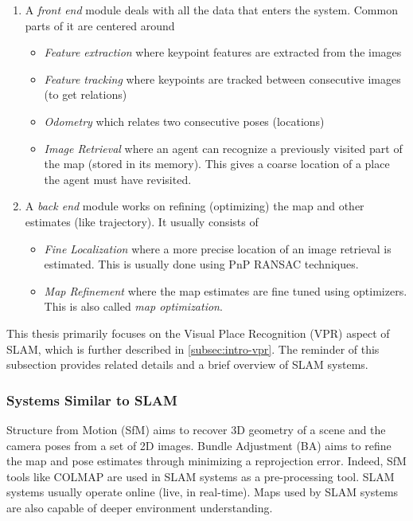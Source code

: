 \begin{enumerate}
    \item A \emph{front end} module deals with all the data that
        enters the system. Common parts of it are centered around
        \begin{itemize}
            \item \emph{Feature extraction} where keypoint features
                are extracted from the images
            \item \emph{Feature tracking} where keypoints are tracked
                between consecutive images (to get relations)
            \item \emph{Odometry} which relates two consecutive poses
                (locations)
            \item \emph{Image Retrieval} where an agent can recognize
                a previously visited part of the map (stored in its
                memory). This gives a coarse location of a place the
                agent must have revisited.
        \end{itemize}
    \item A \emph{back end} module works on refining (optimizing) the
        map and other estimates (like trajectory). It usually consists
        of
        \begin{itemize}
            \item \emph{Fine Localization} where a more precise
                location of an image retrieval is estimated. This is
                usually done using PnP RANSAC techniques.
            \item \emph{Map Refinement} where the map estimates are
                fine tuned using optimizers. This is also called
                \emph{map optimization}.
        \end{itemize}
\end{enumerate}

This thesis primarily focuses on the Visual Place Recognition (VPR)
aspect of SLAM, which is further described in \cref{subsec:intro-vpr}.
The reminder of this subsection provides related details and a brief
overview of SLAM systems.

\subsubsection{Systems Similar to SLAM} 

Structure from Motion (SfM) aims to recover 3D geometry of a scene and
the camera poses from a set of 2D images. Bundle Adjustment (BA) aims
to refine the map and pose estimates through minimizing a reprojection
error. Indeed, SfM tools like COLMAP \cite{Schnberger2016PixelwiseVS,
Schnberger2016StructurefromMotionR} are used in SLAM systems as a
pre-processing tool. SLAM systems usually operate online (live, in
real-time). Maps used by SLAM systems are also capable of deeper
environment understanding.

